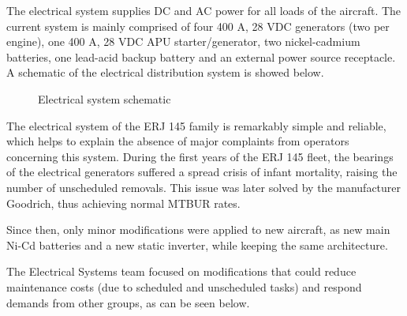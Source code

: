 ﻿The electrical system supplies DC and AC power for all loads of the aircraft. The current system is mainly comprised of four 400 A, 28 VDC generators (two per engine), one 400 A, 28 VDC APU starter/generator, two nickel-cadmium batteries, one lead-acid backup battery and an external power source receptacle. A schematic of the electrical distribution system is showed below.

\begin{figure}[H] %
\caption{Electrical system schematic}
\label{fig:145eletrical}
\end{figure} 

The electrical system of the ERJ 145 family is remarkably simple and reliable, which helps to explain the absence of major complaints from operators concerning this system.
During the first years of the ERJ 145 fleet, the bearings of the electrical generators suffered a spread crisis of infant mortality, raising the number of unscheduled removals. This issue was later solved by the manufacturer Goodrich, thus achieving normal MTBUR rates.

Since then, only minor modifications were applied to new aircraft, as new main Ni-Cd batteries and a new static inverter, while keeping the same architecture.

The Electrical Systems team focused on modifications that could reduce maintenance costs (due to scheduled and unscheduled tasks) and respond demands from other groups, as can be seen below.
